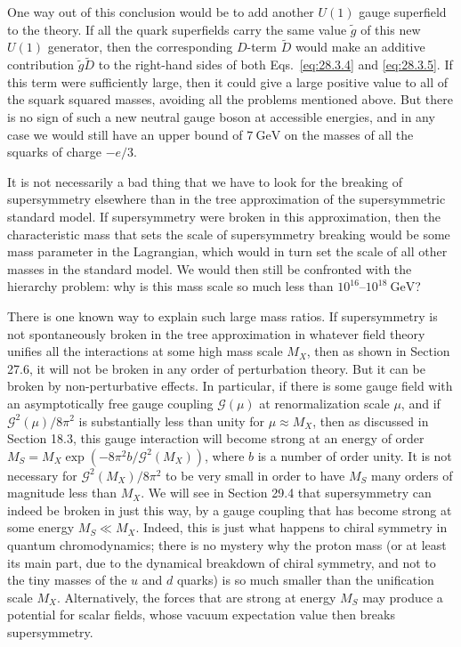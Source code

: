 One way out of this conclusion would be to add another \(U(1)\) gauge
superfield to the theory. If all the quark superfields carry the same value
\(\widetilde{g}\) of this new \(U(1)\) generator, then the corresponding
\(D\)-term \(\widetilde{D}\) would make an additive contribution
\(\widetilde{g}\widetilde{D}\) to the right-hand sides of both
Eqs.~\eqref{eq:28.3.4} and \eqref{eq:28.3.5}. If this term were
sufficiently large, then it could give a large positive value to all of the
squark squared masses, avoiding all the problems mentioned above. But there
is no sign of such a new neutral gauge boson at accessible energies, and in
any case we would still have an upper bound of \(7\ \mathrm{GeV}\) on the
masses of all the squarks of charge \(-e/3\).

It is not necessarily a bad thing that we have to look for the breaking of
supersymmetry elsewhere than in the tree approximation of the
supersymmetric standard model. If supersymmetry were broken in this
approximation, then the characteristic mass that sets the scale of
supersymmetry breaking would be some mass parameter in the Lagrangian,
which would in turn set the scale of all other masses in the standard
model. We would then still be confronted with the hierarchy problem: why
is this mass scale so much less than \(10^{16}\)--\(10^{18}\ \mathrm{GeV}\)?

There is one known way to explain such large mass ratios. If supersymmetry
is not spontaneously broken in the tree approximation in whatever field
theory unifies all the interactions at some high mass scale \(M_X\), then as
shown in Section 27.6, it will not be broken in any order of perturbation
theory. But it can be broken by non-perturbative effects. In particular, if
there is some gauge field with an asymptotically free gauge coupling
\(\mathcal{G}(\mu)\) at renormalization scale \(\mu\), and if
\(\mathcal{G}^2(\mu)/8\pi^2\) is substantially less than unity for
\(\mu\approx M_X\), then as discussed in Section 18.3, this gauge
interaction will become strong at an energy of order
\(M_S=M_X\exp(-8\pi^2b/\mathcal{G}^2(M_X))\), where \(b\) is a number of
order unity. It is not necessary for \(\mathcal{G}^2(M_X)/8\pi^2\) to be
very small in order to have \(M_S\) many orders of magnitude less than
\(M_X\). We will see in Section 29.4 that supersymmetry can indeed be
broken in just this way, by a gauge coupling that has become strong at some
energy \(M_S\ll M_X\). Indeed, this is just what happens to chiral symmetry
in quantum chromodynamics; there is no mystery why the proton mass (or at
least its main part, due to the dynamical breakdown of chiral symmetry, and
not to the tiny masses of the \(u\) and \(d\) quarks) is so much smaller
than the unification scale \(M_X\). Alternatively, the forces that are
strong at energy \(M_S\) may produce a potential for scalar fields, whose
vacuum expectation value then breaks supersymmetry.

